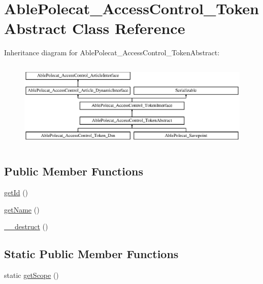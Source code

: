 \hypertarget{class_able_polecat___access_control___token_abstract}{}\section{Able\+Polecat\+\_\+\+Access\+Control\+\_\+\+Token\+Abstract Class Reference}
\label{class_able_polecat___access_control___token_abstract}
Inheritance diagram for Able\+Polecat\+\_\+\+Access\+Control\+\_\+\+Token\+Abstract\+:\begin{figure}[H]
\begin{center}
\leavevmode
\includegraphics[height=4.268293cm]{class_able_polecat___access_control___token_abstract}
\end{center}
\end{figure}
\subsection*{Public Member Functions}
\begin{DoxyCompactItemize}
\item 
\hyperlink{class_able_polecat___access_control___token_abstract_a12251d0c022e9e21c137a105ff683f13}{get\+Id} ()
\item 
\hyperlink{class_able_polecat___access_control___token_abstract_a3d0963e68bb313b163a73f2803c64600}{get\+Name} ()
\item 
\hyperlink{class_able_polecat___access_control___token_abstract_a421831a265621325e1fdd19aace0c758}{\+\_\+\+\_\+destruct} ()
\end{DoxyCompactItemize}
\subsection*{Static Public Member Functions}
\begin{DoxyCompactItemize}
\item 
static \hyperlink{class_able_polecat___access_control___token_abstract_ad9ade868bd136d32967059d1cccb3e92}{get\+Scope} ()
\end{DoxyCompactItemize}
